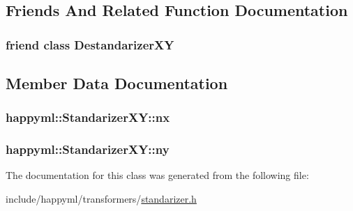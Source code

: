 \subsection{Friends And Related Function Documentation}
\subsubsection[{\texorpdfstring{Destandarizer\+XY}{DestandarizerXY}}]{\setlength{\rightskip}{0pt plus 5cm}friend class {\bf Destandarizer\+XY}\hspace{0.3cm}{\ttfamily [friend]}}\hypertarget{classhappyml_1_1StandarizerXY_a685efff399e4806ec9c79de4c978b0df}{}\label{classhappyml_1_1StandarizerXY_a685efff399e4806ec9c79de4c978b0df}


\subsection{Member Data Documentation}
\subsubsection[{\texorpdfstring{nx}{nx}}]{ happyml\+::\+Standarizer\+X\+Y\+::nx\hspace{0.3cm}{\ttfamily [protected]}}\hypertarget{classhappyml_1_1StandarizerXY_a5fa58f435e964fb2399250ff20bb9333}{}\label{classhappyml_1_1StandarizerXY_a5fa58f435e964fb2399250ff20bb9333}
\subsubsection[{\texorpdfstring{ny}{ny}}]{ happyml\+::\+Standarizer\+X\+Y\+::ny\hspace{0.3cm}{\ttfamily [protected]}}\hypertarget{classhappyml_1_1StandarizerXY_a0395628b7404fa30aafb7ecf9b2bf7cb}{}\label{classhappyml_1_1StandarizerXY_a0395628b7404fa30aafb7ecf9b2bf7cb}


The documentation for this class was generated from the following file\+:\begin{DoxyCompactItemize}
\item 
include/happyml/transformers/\hyperlink{standarizer_8h}{standarizer.\+h}\end{DoxyCompactItemize}
